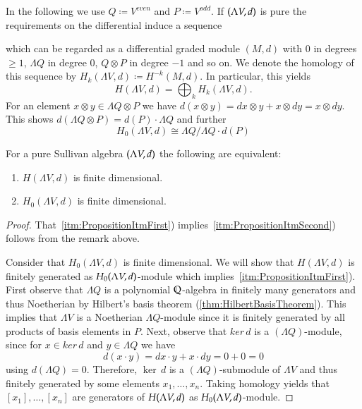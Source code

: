 In the following we use $ Q \coloneqq V^{even}$ and $P \coloneqq V^{odd}$.
If $(\Lambda V,d)$ is pure the requirements on the differential induce a sequence

\centerline{
}

which can be regarded as a differential graded module $(M,d)$ with $0$ in degrees $\geq 1$, $\Lambda Q$ in degree $0$,
$Q \otimes P$ in degree $-1$ and so on.
We denote the homology of this sequence by $H_k(\Lambda V,d) \coloneqq H^{-k}(M,d)$. In particular, this yields
$$ H(\Lambda V,d) = \bigoplus_k H_k(\Lambda V,d).$$
For an element $x \otimes y \in \Lambda Q \otimes P$ we have 
$ d( x \otimes y) = dx \otimes y + x \otimes dy = x \otimes dy$. This shows
$d( \Lambda Q \otimes P) = d(P) \cdot \Lambda Q$ and further
$$H_0(\Lambda V, d) \cong \Lambda Q / \Lambda Q \cdot d(P)$$

\begin{Proposition}
\label{prop:FiniteDimensionDependentOnDegreeOne}

 For a pure Sullivan algebra $(\Lambda V,d)$ the following are equivalent:
 
 \begin{enumerate}
  \item\label{itm:PropositionItmFirst} $H(\Lambda V,d)$ is finite dimensional.
  \item\label{itm:PropositionItmSecond}$H_0(\Lambda V,d)$ is finite dimensional.
 \end{enumerate}

\end{Proposition}

\begin{proof}
 That~\ref{itm:PropositionItmFirst}) implies~\ref{itm:PropositionItmSecond}) follows
 from the remark above. \par Consider that $H_0(\Lambda V,d)$ is finite dimensional.
 We will show that $H(\Lambda V, d)$ is finitely generated as $H_0 (\Lambda V,d)$-module which implies~\ref{itm:PropositionItmFirst}).
 First observe that $\Lambda Q$ is a polynomial $\mathbb{Q}$-algebra in finitely many generators and thus Noetherian by
 Hilbert's basis theorem (\ref{thm:HilbertBasisTheorem}). This implies that $\Lambda V$ is a Noetherian $\Lambda Q$-module since it is 
 finitely generated by all products of basis elements in $ P$. Next, observe that
 $ker \, d$ is a $(\Lambda Q)$-module, since for $x \in ker \, d$ and  $y \in \Lambda Q$ we have
 $$ d(x \cdot y) = dx \cdot y + x \cdot dy = 0 + 0 = 0$$
 using $d(\Lambda Q) = 0$. Therefore, $\ker \, d$ is a $(\Lambda Q)$-submodule of $\Lambda V$ and thus 
 finitely generated by some elements $x_1, \ldots, x_n$. Taking homology yields that $[x_1], \ldots, [x_n]$
 are generators of $H (\Lambda V,d)$ as $H_0 (\Lambda V,d)$-module.
\end{proof}

